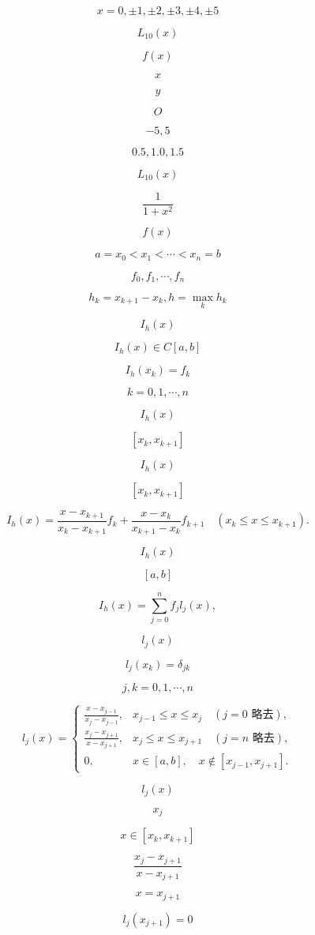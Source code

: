 \documentclass[fontset=fandol]{ctexart}
\begin{document}
\[x=0,\pm1,\pm2,\pm3,\pm4,\pm5\]

\[L_{10}(x)\]

\[f(x)\]

\[x\]

\[y\]

\[O\]

\[-5,5\]

\[0.5,1.0,1.5\]

\[L_{10}(x)\]

\[\frac{1}{1+x^2}\]

\[f(x)\]

\[a=x_0<x_1<\cdots<x_n=b\]

\[f_0,f_1,\cdots,f_n\]

\[h_k=x_{k+1}-x_k,h=\max_k h_k\]

\[I_h(x)\]

\[I_h(x)\in C[a,b]\]

\[I_h(x_k)=f_k\]

\[k=0,1,\cdots,n\]

\[I_h(x)\]

\[[x_k,x_{k+1}]\]

\[I_h(x)\]

\[[x_k,x_{k+1}]\]

\[I_h(x)=\frac{x-x_{k+1}}{x_k-x_{k+1}}f_k+\frac{x-x_k}{x_{k+1}-x_k}f_{k+1}\quad(x_k\leqslant x\leqslant x_{k+1}).\tag{2.7.1}\]

\[I_h(x)\]

\[[a,b]\]

\[I_h(x)=\sum_{j=0}^n f_jl_j(x),\tag{2.7.2}\]

\[l_j(x)\]

\[l_j(x_k)=\delta_{jk}\]

\[j,k=0,1,\cdots,n\]

\[l_j(x)=\begin{cases}
\displaystyle\frac{x-x_{j-1}}{x_j-x_{j-1}},&x_{j-1}\leqslant x\leqslant x_j\quad(j=0\text{ 略去}),\\[6pt]
\displaystyle\frac{x_j-x_{j+1}}{x-x_{j+1}},&x_j\leqslant x\leqslant x_{j+1}\quad(j=n\text{ 略去}),\\[6pt]
0,&x\in[a,b],\quad x\notin[x_{j-1},x_{j+1}].
\end{cases}\tag{2.7.3}\]

\[l_j(x)\]

\[x_j\]

\[x\in[x_k,x_{k+1}]\]

\[\frac{x_j-x_{j+1}}{x-x_{j+1}}\]

\[x=x_{j+1}\]

\[l_j(x_{j+1})=0\]
\end{document}
